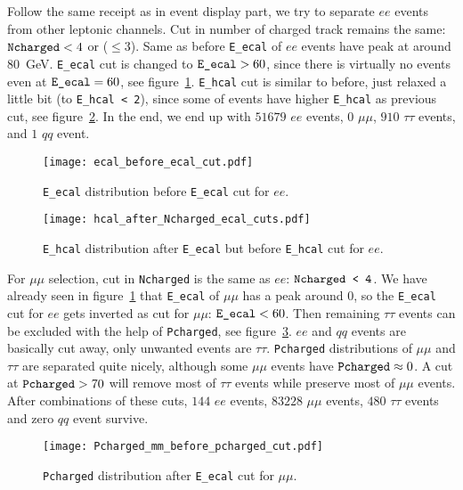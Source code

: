 Follow the same receipt as in event display part, we try to separate $ee$ events from other leptonic channels. Cut in number of charged track remains the same: $\verb|Ncharged| < 4 $ or ($\leq 3$). Same as before \verb|E_ecal| of $ee$ events have peak at around \SI{80}{\giga\eV}. \verb|E_ecal| cut is changed to $\verb|E_ecal| > 60$, since there is virtually no events even at $\verb|E_ecal| = 60$, see figure~\ref{fig:ee_cuts}. \verb|E_hcal| cut is similar to before, just relaxed a little bit (to \verb|E_hcal < 2|), since some of events have higher \verb|E_hcal| as previous cut, see figure~\ref{fig:ee_cuts_hcal}. In the end, we end up with $51679$ $ee$ events, $0$ $\mu\mu$, $910$ $\tau\tau$ events, and $1$ $qq$ event.
\begin{figure}[ht]
	\centering
	\texttt{[image: ecal\_before\_ecal\_cut.pdf]}
	\cprotect\caption{\verb|E_ecal| distribution before \verb|E_ecal| cut for $ee$. }%
	\label{fig:ee_cuts}
\end{figure}
\begin{figure}[ht]
	\centering
	\texttt{[image: hcal\_after\_Ncharged\_ecal\_cuts.pdf]}
	\cprotect\caption{\verb|E_hcal| distribution after \verb|E_ecal| but before \verb|E_hcal| cut for $ee$.}%
	\label{fig:ee_cuts_hcal}
\end{figure}


For $\mu\mu$ selection, cut in \verb|Ncharged| is the same as $ee$: $\verb|Ncharged < 4|$. We have already seen in figure~\ref{fig:ee_cuts} that \verb|E_ecal| of $\mu\mu$ has a peak around $0$, so the \verb|E_ecal| cut for $ee$ gets inverted as cut for $\mu\mu$: $\verb|E_ecal| < 60$. Then remaining $\tau\tau$ events can be excluded with the help of \verb|Pcharged|, see figure~\ref{fig:mm_cuts}. $ee$ and $qq$ events are basically cut away, only unwanted events are $\tau\tau$. \verb|Pcharged| distributions of $\mu\mu$ and $\tau\tau$ are separated quite nicely, although some $\mu\mu$ events have $\verb|Pcharged| \approx 0$. A cut at $\verb|Pcharged| > 70$ will remove most of $\tau\tau$ events while preserve most of $\mu\mu$ events. After combinations of these cuts, $144$ $ee$ events, $83228$ $\mu\mu$ events, $480$ $\tau\tau$ events and zero $qq$ event survive.
\begin{figure}[ht]
	\centering
	\texttt{[image: Pcharged\_mm\_before\_pcharged\_cut.pdf]}
	\cprotect\caption{\verb|Pcharged| distribution after \verb|E_ecal| cut for $\mu\mu$.}%
	\label{fig:mm_cuts}
\end{figure}

